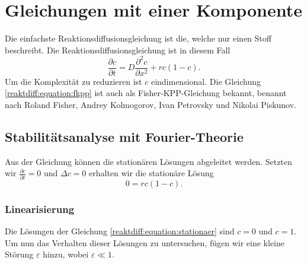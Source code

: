 %
%
%
%
\section{Gleichungen mit einer Komponente
\label{reaktdiff:section:einKomponent}}
Die einfachste Reaktionsdiffusionsgleichung ist die, welche nur einen Stoff beschreibt.
Die Reaktionsdiffusionsgleichung ist in diesem Fall
\begin{equation*}
\label{reaktdiff:equation:fkpp}
\frac{\partial c}{\partial t} = D \frac{\partial^2 c}{\partial x^2} + rc(1-c).
\end{equation*}
Um die Komplexität zu reduzieren ist \(c\) eindimensional. 
Die Gleichung \eqref{reaktdiff:equation:fkpp} ist auch als Fisher-KPP-Gleichung \cite{reaktdiff:wikipedia_kpp_fisher} bekannt, benannt nach Roland Fisher, Andrey Kolmogorov, Ivan Petrovsky und Nikolai Piskunov.
%
%
%
%
%

\subsection{Stabilitätsanalyse mit Fourier-Theorie
\label{reaktdiff:subsection:fkppmathe}}
Aus der Gleichung können die stationären Lösungen abgeleitet werden.
%
Setzten wir \(\frac{\partial c}{\partial t} = 0\) und \(\Delta c = 0\) erhalten wir die stationäre Lösung
\begin{equation}
\label{reaktdiff:equation:stationaer}
0 = rc(1-c).
\end{equation}

\subsubsection{Linearisierung}
%
Die Lösungen der Gleichung
\eqref{reaktdiff:equation:stationaer}
sind \(c = 0\) und \(c = 1\).
Um nun das Verhalten dieser Lösungen zu untersuchen, fügen wir eine kleine Störung \(\varepsilon\) hinzu, wobei \(\varepsilon \ll 1\).

